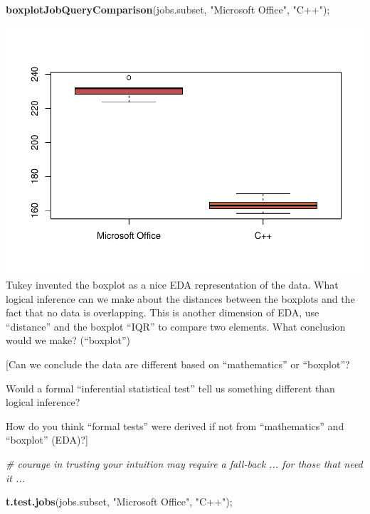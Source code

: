 \documentclass[
]{article}
\newenvironment{Shaded}{\begin{snugshade}}{\end{snugshade}}
\newcommand{\CommentTok}[1]{\textcolor[rgb]{0.56,0.35,0.01}{\textit{#1}}}
\newcommand{\KeywordTok}[1]{\textcolor[rgb]{0.13,0.29,0.53}{\textbf{#1}}}
\newcommand{\NormalTok}[1]{#1}
\newcommand{\StringTok}[1]{\textcolor[rgb]{0.31,0.60,0.02}{#1}}
\begin{document}
\begin{Shaded}
\begin{Highlighting}[]
\KeywordTok{boxplotJobQueryComparison}\NormalTok{(jobs.subset, }\StringTok{"Microsoft Office"}\NormalTok{, }\StringTok{"C++"}\NormalTok{);}
\end{Highlighting}
\end{Shaded}

\includegraphics{graphics/chunk-plotting-jobs-trends-microsoft-2.pdf}
Tukey invented the boxplot as a nice EDA representation of the data.
What logical inference can we make about the distances between the
boxplots and the fact that no data is overlapping. This is another
dimension of EDA, use ``distance'' and the boxplot ``IQR'' to compare
two elements. What conclusion would we make? (``boxplot'')

{[}Can we conclude the data are different based on ``mathematics'' or
``boxplot''?

Would a formal ``inferential statistical test'' tell us something
different than logical inference?

How do you think ``formal tests'' were derived if not from
``mathematics'' and ``boxplot'' (EDA)?{]}

\begin{Shaded}
\begin{Highlighting}[]
\CommentTok{\# courage in trusting your intuition may require a fall{-}back ... for those that need it ...}

\KeywordTok{t.test.jobs}\NormalTok{(jobs.subset, }\StringTok{"Microsoft Office"}\NormalTok{, }\StringTok{"C++"}\NormalTok{); }
\end{Highlighting}
\end{Shaded}
\end{document}
